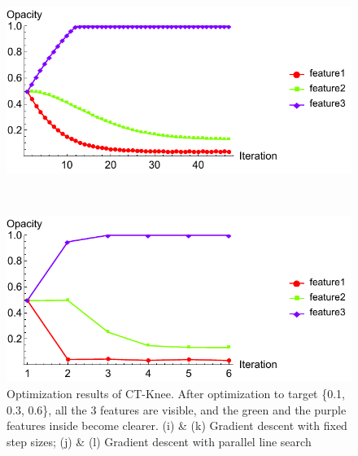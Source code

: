 \begin{figure}
	\begin{minipage}{.49\textwidth}
		\includegraphics[width=1\linewidth]{figures/CT-Knee_naive_opacity_fixed}
		\subcaption{}
	\end{minipage}~
	\begin{minipage}{.49\textwidth}
		\includegraphics[width=1\linewidth]{figures/CT-Knee_naive_opacity_parallelsearch}
		\subcaption{}
	\end{minipage}
	\caption[Optimization results of CT-Knee]{Optimization results of CT-Knee. After optimization to target \{0.1, 0.3, 0.6\}, all the 3 features are visible, and the green and the purple features inside become clearer. (i) \& (k) Gradient descent with fixed step sizes; (j) \& (l) Gradient descent with parallel line search}
	\label{fig:CT-Knee_naive_optimized}
\end{figure}


